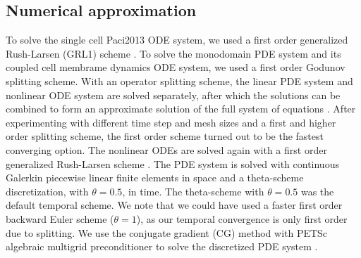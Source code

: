 \documentclass{article}
\begin{document}
\subsection{Numerical approximation} \label{Numerical approximation}
To solve the single cell Paci2013 ODE system, we used a first order generalized Rush-Larsen (GRL1) scheme \cite{rush1978}. To solve the monodomain PDE system and its coupled cell membrame dynamics ODE system, we used a first order Godunov splitting scheme. With an operator splitting scheme, the linear PDE system and nonlinear ODE system are solved separately, after which the solutions can be combined to form an approximate solution of the full system of equations \cite{Sundnes}.  After experimenting with different time step and mesh sizes and a first and higher order splitting scheme, the first order scheme turned out to be the fastest converging option. The nonlinear ODEs are solved again with a first order generalized Rush-Larsen scheme \cite{rush1978}. The PDE system is solved with continuous Galerkin piecewise linear finite elements in space and a theta-scheme discretization, with $\theta=0.5$, in time. The theta-scheme with $\theta=0.5$ was the default temporal scheme. We note that we could have used a faster first order backward Euler scheme ($\theta=1$), as our temporal convergence is only first order due to splitting. We use the conjugate gradient (CG) method with PETSc algebraic multigrid preconditioner to solve the discretized PDE system \cite{petsc-user-ref, petsc-efficient}. 
%
\end{document}
